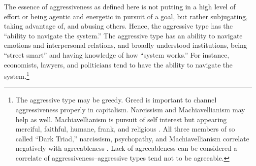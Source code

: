 \documentclass[11pt, letterpaper]{article}
\begin{document}
\begin{spacing}{2.0}
{%
%
%
%
}
The essence of aggressiveness as defined here is not putting in a high level of effort or being agentic and energetic
in pursuit of a goal, but rather subjugating, taking advantage of, and abusing others. 
%
 Hence, the aggressive type has the ``ability to navigate the system.'' 
The aggressive type has an ability to navigate emotions and interpersonal
relations, %
and broadly understood institutions, being ``street smart'' and having knowledge
of how ``system works.'' For instance, economists, lawyers, and politicians tend to have the 
ability to navigate the system.\footnote{The aggressive type may be greedy. Greed is important to channel aggressiveness properly in
capitalism. Narcissism and Machiavellianism may help as well. Machiavellianism is pursuit of self interest but appearing merciful, faithful, humane, frank, and religious \citep{hawley06}. All three members of so called ``Dark Triad,'' narcissism, psychopathy, and Machiavellianism correlate negatively with agreeableness \citep{paulhus02}.  Lack of agreeableness  can be considered a correlate of  aggressiveness--aggressive types tend not to be  agreeable.}



\end{spacing}
\end{document}
